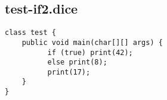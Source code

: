 \subsection{test-if2.dice}
\begin{verbatim}
class test {
	public void main(char[][] args) {
		  if (true) print(42); 
		  else print(8);
  		  print(17);
  	}
}

\end{verbatim}